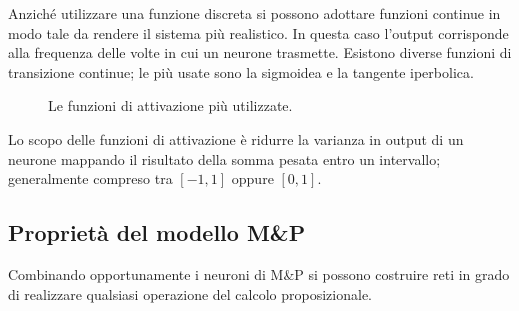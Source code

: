 Anziché utilizzare una funzione discreta si possono adottare funzioni continue in modo tale da rendere il sistema più realistico. In questa caso l'output corrisponde alla frequenza delle volte in cui un neurone trasmette. Esistono diverse funzioni di transizione continue; le più usate sono la sigmoidea e la tangente iperbolica.\\

\begin{figure}[h!]
	\begin{center}
		\qquad
		\qquad
		\caption{Le funzioni di attivazione più utilizzate.}
	\end{center}
\end{figure}

Lo scopo delle funzioni di attivazione è ridurre la varianza in output di un neurone mappando il risultato della somma pesata entro un intervallo; generalmente compreso tra $[-1, 1]$ oppure $[0, 1]$.

\newpage

\subsection{Proprietà del modello M\&P} %
\label{sub:proprietà_del_modello}
Combinando opportunamente i neuroni di M\&P si possono costruire reti in grado di realizzare qualsiasi operazione del calcolo proposizionale.

